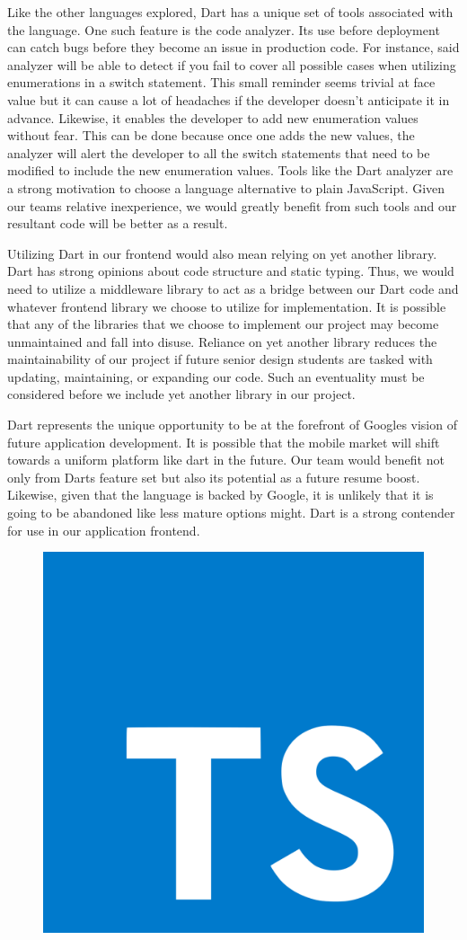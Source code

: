 \documentclass[12pt]{article}
\begin{document}
Like the other languages explored, Dart has a unique set of tools associated with the language. One such feature is the code analyzer. Its use before deployment can catch bugs before they become an issue in production code. For instance, said analyzer will be able to detect if you fail to cover all possible cases when utilizing enumerations in a switch statement. This small reminder seems trivial at face value but it can cause a lot of headaches if the developer doesn't anticipate it in advance. Likewise, it enables the developer to add new enumeration values without fear. This can be done because once one adds the new values, the analyzer will alert the developer to all the switch statements that need to be modified to include the new enumeration values. Tools like the Dart analyzer are a strong motivation to choose a language alternative to plain JavaScript. Given our teams relative inexperience, we would greatly benefit from such tools and our resultant code will be better as a result.

Utilizing Dart in our frontend would also mean relying on yet another library. Dart has strong opinions about code structure and static typing. Thus, we would need to utilize a middleware library to act as a bridge between our Dart code and whatever frontend library we choose to utilize for implementation. It is possible that any of the libraries that we choose to implement our project may become unmaintained and fall into disuse. Reliance on yet another library reduces the maintainability of our project if future senior design students are tasked with updating, maintaining, or expanding our code. Such an eventuality must be considered before we include yet another library in our project.

Dart represents the unique opportunity to be at the forefront of Googles vision of future application development. It is possible that the mobile market will shift towards a uniform platform like dart in the future. Our team would benefit not only from Darts feature set but also its potential as a future resume boost. Likewise, given that the language is backed by Google, it is unlikely that it is going to be abandoned like less mature options might. Dart is a strong contender for use in our application frontend.

\begin{figure}[h]
	\centering
	\includegraphics[width=0.25\linewidth]{typescript}
\end{figure}
\end{document}
